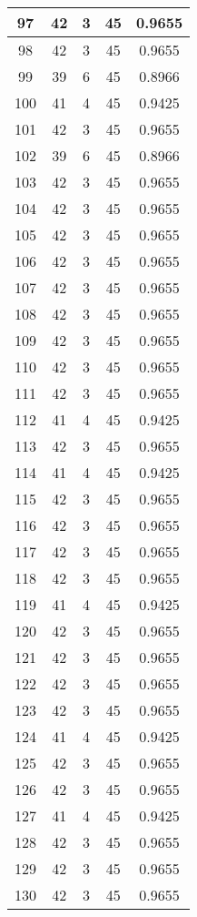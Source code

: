 \documentclass[letterpaper, 12pt]{article}
\begin{document}
\begin{longtable}{|c|c|c|c|c|}
\hline
97 & 42 & 3 & 45 & 0.9655 \\
\hline
98 & 42 & 3 & 45 & 0.9655 \\
\hline
99 & 39 & 6 & 45 & 0.8966 \\
\hline
100 & 41 & 4 & 45 & 0.9425 \\
\hline
101 & 42 & 3 & 45 & 0.9655 \\
\hline
102 & 39 & 6 & 45 & 0.8966 \\
\hline
103 & 42 & 3 & 45 & 0.9655 \\
\hline
104 & 42 & 3 & 45 & 0.9655 \\
\hline
105 & 42 & 3 & 45 & 0.9655 \\
\hline
106 & 42 & 3 & 45 & 0.9655 \\
\hline
107 & 42 & 3 & 45 & 0.9655 \\
\hline
108 & 42 & 3 & 45 & 0.9655 \\
\hline
109 & 42 & 3 & 45 & 0.9655 \\
\hline
110 & 42 & 3 & 45 & 0.9655 \\
\hline
111 & 42 & 3 & 45 & 0.9655 \\
\hline
112 & 41 & 4 & 45 & 0.9425 \\
\hline
113 & 42 & 3 & 45 & 0.9655 \\
\hline
114 & 41 & 4 & 45 & 0.9425 \\
\hline
115 & 42 & 3 & 45 & 0.9655 \\
\hline
116 & 42 & 3 & 45 & 0.9655 \\
\hline
117 & 42 & 3 & 45 & 0.9655 \\
\hline
118 & 42 & 3 & 45 & 0.9655 \\
\hline
119 & 41 & 4 & 45 & 0.9425 \\
\hline
120 & 42 & 3 & 45 & 0.9655 \\
\hline
121 & 42 & 3 & 45 & 0.9655 \\
\hline
122 & 42 & 3 & 45 & 0.9655 \\
\hline
123 & 42 & 3 & 45 & 0.9655 \\
\hline
124 & 41 & 4 & 45 & 0.9425 \\
\hline
125 & 42 & 3 & 45 & 0.9655 \\
\hline
126 & 42 & 3 & 45 & 0.9655 \\
\hline
127 & 41 & 4 & 45 & 0.9425 \\
\hline
128 & 42 & 3 & 45 & 0.9655 \\
\hline
129 & 42 & 3 & 45 & 0.9655 \\
\hline
130 & 42 & 3 & 45 & 0.9655 \\

\end{longtable}
\end{document}
